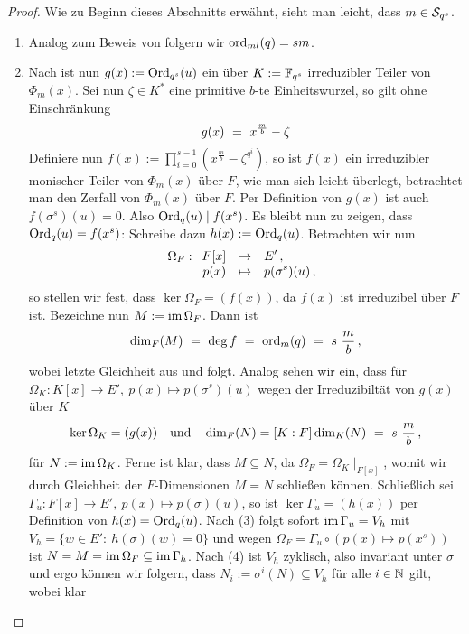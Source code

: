 \begin{proof}
  Wie zu Beginn dieses Abschnitts erwähnt, sieht man leicht, dass
  $m \in \S_{q^s}$.
  \begin{enumerate}
    \item Analog zum Beweis von  
      folgern wir $\ord_{ml}(q) = sm$.
    \item Nach  ist nun
      $g(x) := \Ord_{q^s}(u)$ ein über $K := \F_{q^s}$ irreduzibler Teiler von
      $\Phi_m(x)$. Sei nun $\zeta\in K^\ast$ eine primitive $b$-te Einheitswurzel,
      so gilt ohne Einschränkung
      \[ g(x) \speq= x^{\frac m b} -\zeta\]
      Definiere nun $f(x) := \prod_{i=0}^{s-1} (x^{\frac m b} - \zeta^{q^i})$, 
      so ist $f(x)$ ein irreduzibler monischer Teiler von $\Phi_m(x)$ über $F$,
      wie man sich leicht überlegt, betrachtet man den Zerfall von
      $\Phi_m(x)$ über $F$. Per Definition von $g(x)$ ist auch
      $f(\sigma^s)(u) = 0$. Also $\Ord_q(u) \mid f(x^s)$.
      Es bleibt nun zu zeigen, dass $\Ord_q(u) = f(x^s)$:
      Schreibe dazu $h(x) := \Ord_q(u)$. 
      Betrachten wir nun 
      \[ \Omega_F:\funcdef{ F[x] &\to& E'\,, \\
        p(x) &\mapsto& p(\sigma^s)(u)\,,}\]
      so stellen wir fest, dass $\ker\Omega_F = (f(x))$, da $f(x)$ ist irreduzibel
      über $F$ ist.
      Bezeichne nun $M := \im\Omega_F$. Dann ist 
      \[ \dim_F(M) \speq= \deg f \speq= \ord_m(q) \speq= s\ \frac m b\,,\]
      wobei letzte Gleichheit aus  und 
      folgt. Analog sehen wir ein, dass für
      $\Omega_K: K[x] \to E',\ p(x) \mapsto p(\sigma^s)(u)$ wegen der
      Irreduzibiltät von $g(x)$ über $K$
      \[ \ker\Omega_K = (g(x)) \quad\text{und}\quad
        \dim_F(N)= [K:F]\dim_K(N) \speq= s\ \frac m b\,,\]
      für $N := \im\Omega_K$. Ferne ist klar, dass $M\subseteq N$, da
      $\Omega_F = \Omega_K\mid_{F[x]}$, womit wir durch Gleichheit der
      $F$-Dimensionen $M=N$ schließen können.
      Schließlich sei $\Gamma_u: F[x]\to E',\ p(x) \mapsto p(\sigma)(u)$, so
      ist $\ker\Gamma_u = (h(x))$ per Definition von $h(x)= \Ord_q(u)$. 
      Nach  (3) folgt sofort
      $\im\Gamma_u = V_h$ mit $V_h = \{ w\in E':\ h(\sigma)(w) = 0 \}$
      und wegen $\Omega_F = \Gamma_u \circ (p(x)\mapsto p(x^s))$ ist
      $N = M = \im\Omega_F \subseteq \im \Gamma_h$. Nach 
       (4) ist $V_h$ zyklisch, also invariant
      unter $\sigma$ und ergo können wir folgern, dass
      $N_i := \sigma^i(N) \subseteq V_h$ für alle $i\in \N$ gilt, wobei klar

\end{enumerate}
\end{proof}
